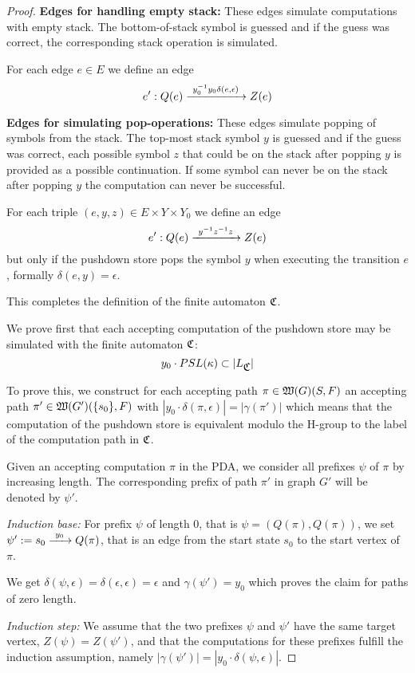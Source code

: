 \begin{proof}
\bigskip
{\bf Edges for handling empty stack:} These edges simulate computations with
empty stack. The bottom-of-stack symbol is guessed and if the guess was correct, the
corresponding stack operation is simulated.

For each edge $e \in E$ we define an edge
\[ e': Q(e) \xrightarrow{\ {y_0^{-1} y_0 \delta(e, \epsilon)}\ } Z(e) \] 

\bigskip
{\bf Edges for simulating pop-operations:} These edges simulate popping of
symbols from the stack.
The top-most stack symbol $y$ is guessed and if the guess was correct, each
possible symbol $z$ that could be on the stack after popping $y$ is provided as
a possible continuation. If some symbol can never be on the stack after
popping $y$ the computation can never be successful. 

For each triple $(e, y, z) \in E \times Y
\times Y_0$ we define an edge
\[ e': Q(e) \xrightarrow{\ {y^{-1} z^{-1} z}\ } Z(e) \]
but only if the pushdown store pops the symbol $y$ when executing the transition
$e$, formally $\delta(e, y) = \epsilon$.

\bigskip
This completes the definition of the finite automaton $\mbox{$\mathfrak{C}$}$.

We prove first that each accepting computation of the pushdown store may be
simulated with the finite automaton $\mbox{$\mathfrak{C}$}$:
\[ y_0 \cdot PSL(\kappa) \subset |L_{\mbox{$\mathfrak{C}$}}| \]

To prove this, we construct for each accepting path $\pi \in
\mbox{$\mathfrak{W}({G})$}(S,F)$ an accepting path $\pi' \in
\mbox{$\mathfrak{W}({G'})$}(\mbox{$\{s_0\}$}, F)$ with $|y_0 \cdot \delta(\pi, \epsilon)| = |\gamma(\pi')|$ 
which means that the computation of the pushdown store is equivalent modulo the
H-group to the label of the computation path in $\mbox{$\mathfrak{C}$}$.

Given an accepting computation $\pi$ in the PDA, we consider all prefixes
$\psi$ of $\pi$ by increasing length. The corresponding prefix of path $\pi'$ in
graph $G'$ will be denoted by $\psi'$.

{\em Induction base:} For prefix $\psi$ of length 0, that is $\psi =
(Q(\pi), Q(\pi))$, we set $\psi' := s_0 \xrightarrow{\ {y_0}\ } Q(\pi)$, that
is an edge from the start state $s_0$ to the start vertex of $\pi$. 

We get $\delta(\psi, \epsilon) = \delta(\epsilon, \epsilon) = \epsilon$ and
$\gamma(\psi') = y_0$ which proves the claim for paths of zero length.

{\em Induction step:} We assume that the two prefixes $\psi$ and $\psi'$ have
the same target vertex, $Z(\psi) = Z(\psi')$, and that the computations for
these prefixes fulfill the induction assumption, namely $|\gamma(\psi')| =
|y_0 \cdot \delta(\psi, \epsilon)|$.


\end{proof}
